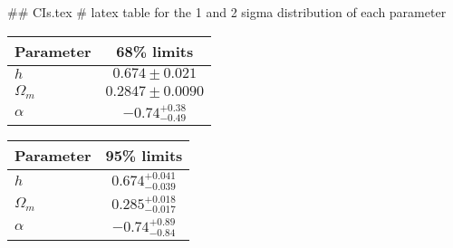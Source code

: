 ## CIs.tex
# latex table for the 1 and 2 sigma distribution of each parameter

\begin{tabular} { l  c}
 Parameter &  68\% limits\\
\hline
{\boldmath$h              $} & $0.674\pm 0.021            $\\
{\boldmath$\Omega_m       $} & $0.2847\pm 0.0090          $\\
{\boldmath$\alpha         $} & $-0.74^{+0.38}_{-0.49}     $\\
\hline
\end{tabular}

\begin{tabular} { l  c}
 Parameter &  95\% limits\\
\hline
{\boldmath$h              $} & $0.674^{+0.041}_{-0.039}   $\\
{\boldmath$\Omega_m       $} & $0.285^{+0.018}_{-0.017}   $\\
{\boldmath$\alpha         $} & $-0.74^{+0.89}_{-0.84}     $\\
\hline
\end{tabular}
